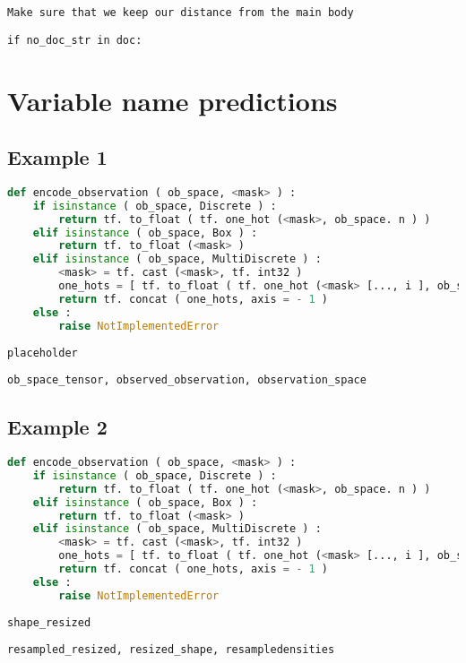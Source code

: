     \begin{lstlisting}[caption={Label}]
Make sure that we keep our distance from the main body
    \end{lstlisting}
    \begin{lstlisting}[caption={Prediction}]
if no_doc_str in doc:
    \end{lstlisting}

\section{Variable name predictions} \label{rename_pred}
    
\subsection{Example 1}
    \begin{lstlisting}[language=Python, caption={Input code}]
def encode_observation ( ob_space, <mask> ) : 
    if isinstance ( ob_space, Discrete ) : 
        return tf. to_float ( tf. one_hot (<mask>, ob_space. n ) ) 
    elif isinstance ( ob_space, Box ) : 
        return tf. to_float (<mask> ) 
    elif isinstance ( ob_space, MultiDiscrete ) : 
        <mask> = tf. cast (<mask>, tf. int32 ) 
        one_hots = [ tf. to_float ( tf. one_hot (<mask> [..., i ], ob_space. nvec [ i ] ) ) for i in range (<mask>. shape [ - 1 ] ) ] 
        return tf. concat ( one_hots, axis = - 1 ) 
    else : 
        raise NotImplementedError 
    \end{lstlisting}
    \begin{lstlisting}[caption={Label}]
placeholder
    \end{lstlisting}
    \begin{lstlisting}[caption={Top 3 predictions}]
ob_space_tensor, observed_observation, observation_space
    \end{lstlisting}
    
\subsection{Example 2}
    \begin{lstlisting}[language=Python, caption={Input code}]
def encode_observation ( ob_space, <mask> ) : 
    if isinstance ( ob_space, Discrete ) : 
        return tf. to_float ( tf. one_hot (<mask>, ob_space. n ) ) 
    elif isinstance ( ob_space, Box ) : 
        return tf. to_float (<mask> ) 
    elif isinstance ( ob_space, MultiDiscrete ) : 
        <mask> = tf. cast (<mask>, tf. int32 ) 
        one_hots = [ tf. to_float ( tf. one_hot (<mask> [..., i ], ob_space. nvec [ i ] ) ) for i in range (<mask>. shape [ - 1 ] ) ] 
        return tf. concat ( one_hots, axis = - 1 ) 
    else : 
        raise NotImplementedError 
    \end{lstlisting}
    \begin{lstlisting}[caption={Label}]
shape_resized
    \end{lstlisting}
    \begin{lstlisting}[caption={Top 3 predictions}]
resampled_resized, resized_shape, resampledensities
    \end{lstlisting}
    
